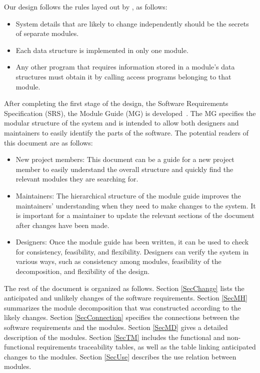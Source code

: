 \documentclass[10pt, titlepage]{article}
\begin{document}
Our design follows the rules layed out by \cite{ParnasEtAl1984}, as follows:
\begin{itemize}
\item System details that are likely to change independently should be the
  secrets of separate modules.
\item Each data structure is implemented in only one module.
\item Any other program that requires information stored in a module's data
  structures must obtain it by calling access programs belonging to that module.
\end{itemize}

After completing the first stage of the design, the Software Requirements
Specification (SRS), the Module Guide (MG) is developed~\cite{ParnasEtAl1984}. The MG
specifies the modular structure of the system and is intended to allow both
designers and maintainers to easily identify the parts of the software.  The
potential readers of this document are as follows:

\begin{itemize}
\item New project members: This document can be a guide for a new project member
  to easily understand the overall structure and quickly find the
  relevant modules they are searching for.
\item Maintainers: The hierarchical structure of the module guide improves the
  maintainers' understanding when they need to make changes to the system. It is
  important for a maintainer to update the relevant sections of the document
  after changes have been made.
\item Designers: Once the module guide has been written, it can be used to
  check for consistency, feasibility, and flexibility. Designers can verify the
  system in various ways, such as consistency among modules, feasibility of the
  decomposition, and flexibility of the design.
\end{itemize}

The rest of the document is organized as follows. Section
\ref{SecChange} lists the anticipated and unlikely changes of the software
requirements. Section \ref{SecMH} summarizes the module decomposition that
was constructed according to the likely changes. Section \ref{SecConnection}
specifies the connections between the software requirements and the
modules. Section \ref{SecMD} gives a detailed description of the
modules. Section \ref{SecTM} includes the functional and non-functional requirements
traceability tables, as well as the table linking anticipated changes to the modules. Section
\ref{SecUse} describes the use relation between modules.
\end{document}
